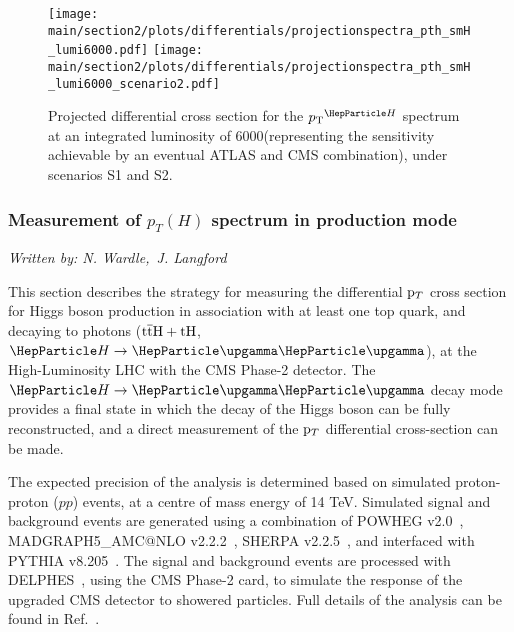 \begin{figure}%
  \centering
  \texttt{[image: \\main/section2/plots/differentials/projectionspectra\_pth\_smH\_lumi6000.pdf]}
  \texttt{[image: \\main/section2/plots/differentials/projectionspectra\_pth\_smH\_lumi6000\_scenario2.pdf]}
  \caption{Projected differential cross section for the $\pTH$ spectrum at an integrated luminosity of 6000\fbinv (representing the sensitivity achievable by an eventual ATLAS and CMS combination), under scenarios S1
    and S2.}
  \label{fig:proj_pth_6000}
\end{figure}

\subsubsection{Measurement of $p_{T}(H)$ spectrum  in \ttH production mode}
\label{sec:ttHdiffxs}

\begin{center}{\it Written by: N. Wardle,~J. Langford} \end{center}

This section describes the strategy for measuring the differential $\mathrm{p}_{T}$ cross section for 
Higgs boson production in association with at least one top quark, and decaying to photons ($\text{t}\overline{\text{t}}\text{H}+\text{tH}$, $\hgg$), 
at the High-Luminosity LHC with the CMS Phase-2 detector. The $\hgg$ decay mode provides a final state in which the decay of the Higgs boson can be fully reconstructed, and a direct measurement of the $\mathrm{p}_{T}$ differential cross-section can be made. 

The expected precision of the analysis is determined based on simulated proton-proton ($pp$) events, at a centre of mass energy of 14 TeV.
Simulated signal and background events are generated using a combination of {\sc POWHEG}
v2.0~\cite{Alioli:2010xd,Nason:2009ai}, {\sc MADGRAPH5\_AMC@NLO} v2.2.2~\cite{Alwall:2014hca}, {\sc SHERPA} v2.2.5~\cite{Gleisberg:2008ta}, and interfaced with {\sc PYTHIA} v8.205~\cite{Sjostrand:2007gs}. The signal and background events are processed with {\sc DELPHES}~\cite{deFavereau:2013fsa}, using the CMS Phase-2 card, to simulate the response of the upgraded CMS detector to showered particles. Full details of the analysis can be found in Ref.~\cite{CMS-PAS-FTR-18-020}.

